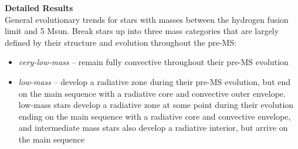 \textbf{Detailed Results} \\
General evolutionary trends for stars with masses between the hydrogen fusion limit and 5 Msun. Break stars up into three mass categories that are largely defined by their structure and evolution throughout the pre-MS: 
\begin{itemize}
 \item[] {\it very-low-mass} -- remain fully convective throughout their pre-MS evolution
 \item[] {\it low-mass} -- develop a radiative zone during their pre-MS evolution, but end on the main sequence with a radiative core and convective outer envelope.
low-mass stars develop a radiative zone at some point during their evolution ending on the main sequence with a radiative core and convective envelope, and intermediate mass stars also develop a radiative interior, but arrive on the main sequence
\end{itemize}